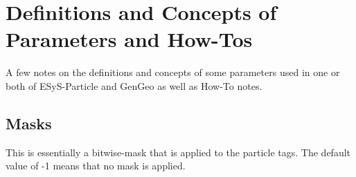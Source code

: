 
\chapter{Definitions and Concepts of Parameters and How-Tos}
\label{cha:definitions_and_concepts_of_parameters}

A few notes on the definitions and concepts of some parameters used in one or both of ESyS-Particle and GenGeo as well as How-To notes.

\section{Masks}
\label{sec:masks}

This is essentially a bitwise-mask that is applied to the particle tags. The default value of -1 means that no mask is applied.

